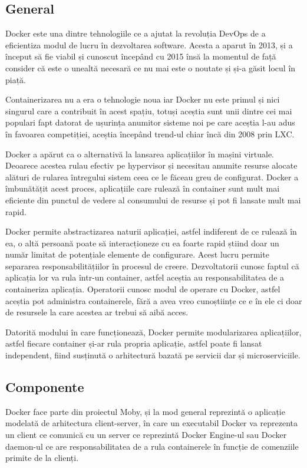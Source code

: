 \subsection{General}

Docker este una dintre tehnologiile ce a ajutat la revoluția DevOps de a eficientiza
modul de lucru în dezvoltarea software. Acesta a aparut în 2013, și a început să fie
viabil și cunoscut începând cu 2015 însă la momentul de față consider că este o 
unealtă necesară ce nu mai este o noutate și și-a găsit locul în piață.

Containerizarea nu a era o tehnologie noua iar Docker nu este primul și nici singurul
care a contribuit în acest spațiu, totuși aceștia sunt unii dintre cei mai populari 
fapt datorat de ușurința anumitor sisteme noi pe care aceștia l-au adus în favoarea
competiției, aceștia începând trend-ul chiar încă din 2008 prin LXC.

Docker a apărut ca o alternativă la lansarea aplicațiilor în mașini virtuale. Deoarece 
acestea rulau efectiv pe hypervisor și necesitau anumite resurse alocate alături de rularea
întregului sistem ceea ce le făceau greu de configurat. Docker a îmbunătățit acest proces,
aplicațiile care rulează în container sunt mult mai eficiente din punctul de vedere
al consumului de resurse și pot fi lansate mult mai rapid.

Docker permite abstractizarea naturii aplicației, astfel indiferent de ce rulează în ea,
o altă persoană poate să interacționeze cu ea foarte rapid știind doar
un număr limitat de potențiale elemente de configurare. Acest lucru permite separarea 
responsabilitățiilor în procesul de creere. Dezvoltatorii cunosc faptul că aplicația lor va 
rula într-un container, astfel aceștia au responsabilitatea de a containeriza aplicația.
Operatorii cunosc modul de operare cu Docker, astfel aceștia pot administra containerele, 
fără a avea vreo cunoștiințe ce e în ele ci doar de resursele la care acestea ar trebui să 
aibă acces.

Datorită modului în care funcționează, Docker permite modularizarea aplicațiilor, 
astfel fiecare container și-ar rula propria aplicație, astfel poate fi lansat independent, 
fiind susținută o arhitectură bazată pe servicii dar și microserviciile.

\subsection{Componente}

Docker face parte din proiectul Moby, și la mod general reprezintă o aplicație modelată
de arhitectura client-server, în care un executabil Docker va reprezenta un client ce 
comunică cu un server ce reprezintă Docker Engine-ul sau Docker daemon-ul ce are 
responsabilitatea de a rula containerele în funcție de comenziile primite de la clienți.

